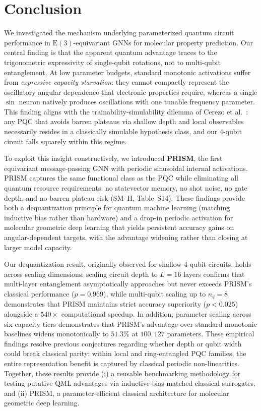 \documentclass[10pt,twocolumn,letterpaper]{article}
\begin{document}
\section{Conclusion}
\label{sec:conclusion}

We investigated the mechanism underlying parameterized quantum circuit performance in $\mathrm{E}(3)$-equivariant GNNs for molecular property prediction. Our central finding is that the apparent quantum advantage traces to the trigonometric expressivity of single-qubit rotations, not to multi-qubit entanglement. At low parameter budgets, standard monotonic activations suffer from \textit{expressive capacity starvation}: they cannot compactly represent the oscillatory angular dependence that electronic properties require, whereas a single $\sin$ neuron natively produces oscillations with one tunable frequency parameter. This finding aligns with the trainability-simulability dilemma of Cerezo et al.~\cite{Cerezo:2023nqf}: any PQC that avoids barren plateaus via shallow depth and local observables necessarily resides in a classically simulable hypothesis class, and our 4-qubit circuit falls squarely within this regime.

To exploit this insight constructively, we introduced \textbf{PRISM}, the first equivariant message-passing GNN with periodic sinusoidal internal activations. PRISM captures the same functional class as the PQC while eliminating all quantum resource requirements: no statevector memory, no shot noise, no gate depth, and no barren plateau risk (SM~H, Table~S14). These findings provide both a dequantization principle for quantum machine learning (matching inductive bias rather than hardware) and a drop-in periodic activation for molecular geometric deep learning that yields persistent accuracy gains on angular-dependent targets, with the advantage widening rather than closing at larger model capacity.

Our dequantization result, originally observed for shallow 4-qubit circuits, holds across scaling dimensions: scaling circuit depth to $L = 16$ layers confirms that multi-layer entanglement asymptotically approaches but never exceeds PRISM's classical performance ($p = 0.969$), while multi-qubit scaling up to $n_q = 8$ demonstrates that PRISM maintains strict accuracy superiority ($p < 0.025$) alongside a $540\times$ computational speedup. In addition, parameter scaling across six capacity tiers demonstrates that PRISM's advantage over standard monotonic baselines widens monotonically to $51.3\%$ at $100{,}127$ parameters. These empirical findings resolve previous conjectures regarding whether depth or qubit width could break classical parity: within local and ring-entangled PQC families, the entire representation benefit is captured by classical periodic non-linearities. Together, these results provide (i) a reusable benchmarking methodology for testing putative QML advantages via inductive-bias-matched classical surrogates, and (ii) PRISM, a parameter-efficient classical architecture for molecular geometric deep learning.
\end{document}
